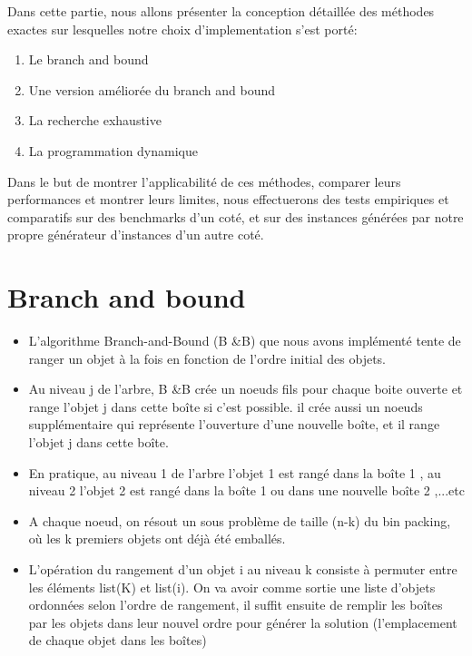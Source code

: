 \documentclass[12pt]{article}
\begin{document}
Dans cette partie, nous allons présenter la conception détaillée des méthodes exactes sur lesquelles notre choix d'implementation s'est porté:

\begin{enumerate}

\item Le branch and bound

\item Une version améliorée du branch and bound

\item La recherche exhaustive

\item La programmation dynamique
\end{enumerate}
Dans le but de montrer l’applicabilité de ces méthodes, comparer leurs performances et montrer leurs limites, nous effectuerons des tests empiriques et comparatifs sur des benchmarks d’un coté, et sur des instances générées par notre propre générateur d’instances d’un autre coté.
\setcounter{section}{0}
\section{Branch and bound}
\begin{itemize}
    \item L'algorithme Branch-and-Bound (B \&B) que nous avons implémenté tente de ranger un objet à la fois en fonction de l’ordre initial des objets. 
    \item Au niveau j de l’arbre, B \&B crée un noeuds fils pour chaque boite ouverte et range l’objet j dans cette boîte si c’est possible. il crée aussi un noeuds supplémentaire qui représente l’ouverture d’une nouvelle boîte, et il range l’objet j dans cette boîte.
    \item En pratique, au niveau 1 de l’arbre l’objet 1 est rangé dans la boîte 1 , au niveau 2 l’objet 2 est rangé dans la boîte 1 ou dans une nouvelle boîte 2 ,...etc 
    \item A chaque noeud, on résout un sous problème de taille (n-k) du bin packing, où les k premiers objets ont déjà été emballés.
    \item L’opération du rangement d’un objet i au niveau k consiste à permuter entre les éléments list(K) et list(i). On va avoir comme sortie une liste d’objets ordonnées selon l’ordre de rangement, il suffit ensuite de remplir les boîtes par les objets dans leur nouvel ordre pour générer la solution (l’emplacement de chaque objet dans les boîtes) 
\end{itemize}
\end{document}
